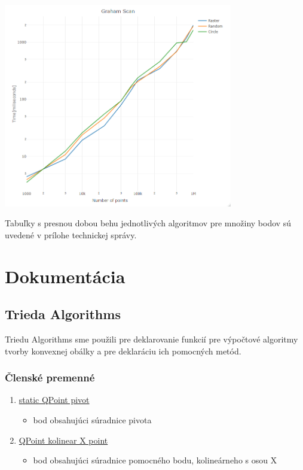 \documentclass[12pt]{article}
\begin{document}
\begin{center}
   \includegraphics[width=10cm]{./img/plot_graham_scan.png}
\end{center}

Tabuľky s presnou dobou behu jednotlivých algoritmov pre množiny bodov sú uvedené v prílohe technickej správy.

\clearpage
\section{Dokumentácia}
\subsection{Trieda Algorithms}
Triedu Algorithms sme použili pre deklarovanie funkcií pre výpočtové algoritmy tvorby konvexnej obálky a pre deklaráciu ich pomocných metód.

\subsubsection{Členské premenné}

\begin{enumerate}
\item[] \underline{static QPoint pivot} 
\begin{itemize}
\item bod obsahujúci súradnice pivota
\end{itemize}
\item[] \underline{QPoint kolinear X point} 
\begin{itemize}
\item bod obsahujúci súradnice pomocného bodu, kolineárneho s osou X
\end{itemize}
\end{enumerate}
\end{document}
